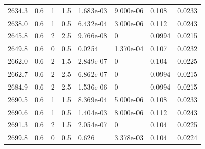 \documentclass[preview]{standalone}
\begin{document}
{{{{{{{{{\begin{tabular}{L{1.2cm}C{1.2cm} C{0.3cm}C{0.5cm} C{1.4cm}C{1.4cm} C{1.4cm}C{1.4cm}}
  2634.3  &   0.6  & 1     & 1.5 &  1.683e-03  & 9.000e-06  & 0.108 &  0.0233   \\ 
  2638.0  &   0.6  & 1     & 0.5 &  6.432e-04  & 3.000e-06  & 0.112 &  0.0243   \\ 
  2645.8  &   0.6  & 2     & 2.5 &  9.766e-08  & 0  & 0.0994 &  0.0215   \\ 
  2649.8  &   0.6  & 0     & 0.5 &  0.0254  & 1.370e-04  & 0.107 &  0.0232   \\ 
  2662.0  &   0.6  & 2     & 1.5 &  2.849e-07  & 0  & 0.104 &  0.0225   \\ 
  2662.7  &   0.6  & 2     & 2.5 &  6.862e-07  & 0  & 0.0994 &  0.0215   \\ 
  2684.9  &   0.6  & 2     & 2.5 &  1.536e-06  & 0  & 0.0994 &  0.0215   \\ 
  2690.5  &   0.6  & 1     & 1.5 &  8.369e-04  & 5.000e-06  & 0.108 &  0.0233   \\ 
  2690.6  &   0.6  & 1     & 0.5 &  1.404e-03  & 8.000e-06  & 0.112 &  0.0243   \\ 
  2691.3  &   0.6  & 2     & 1.5 &  2.054e-07  & 0  & 0.104 &  0.0225   \\ 
  2699.8  &   0.6  & 0     & 0.5 &  0.626  & 3.378e-03  & 0.104 &  0.0224   \\ 
\hline 
\end{tabular} 

}}}}}}}}}
\end{document}
